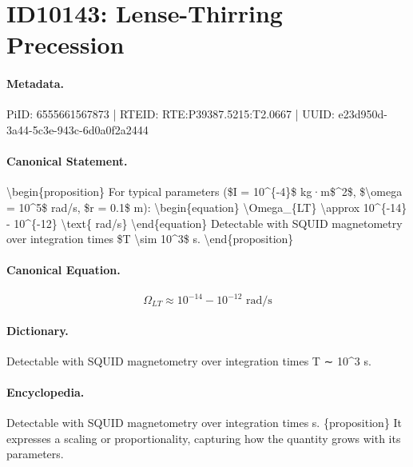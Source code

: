 \section*{ID10143: Lense-Thirring Precession}
\paragraph{Metadata.}
PiID: 6555661567873 | RTEID: RTE:P39387.5215:T2.0667 | UUID: e23d950d-3a44-5c3e-943c-6d0a0f2a2444

\paragraph{Canonical Statement.}
\textbackslash{}begin\{proposition\} For typical parameters (\$I = 10\textasciicircum{}\{-4\}\$ kg·m\$\textasciicircum{}2\$, \$\textbackslash{}omega = 10\textasciicircum{}5\$ rad/s, \$r = 0.1\$ m): \textbackslash{}begin\{equation\} \textbackslash{}Omega\_\{LT\} \textbackslash{}approx 10\textasciicircum{}\{-14\} - 10\textasciicircum{}\{-12\} \textbackslash{}text\{ rad/s\} \textbackslash{}end\{equation\} Detectable with SQUID magnetometry over integration times \$T \textbackslash{}sim 10\textasciicircum{}3\$ s. \textbackslash{}end\{proposition\}

\paragraph{Canonical Equation.}
\[
\Omega_{LT} \approx 10^{-14} - 10^{-12} \text{ rad/s}
\]

\paragraph{Dictionary.}
Detectable with SQUID magnetometry over integration times T ∼ 10\textasciicircum{}3 s.

\paragraph{Encyclopedia.}
Detectable with SQUID magnetometry over integration times s. \{proposition\} It expresses a scaling or proportionality, capturing how the quantity grows with its parameters.
